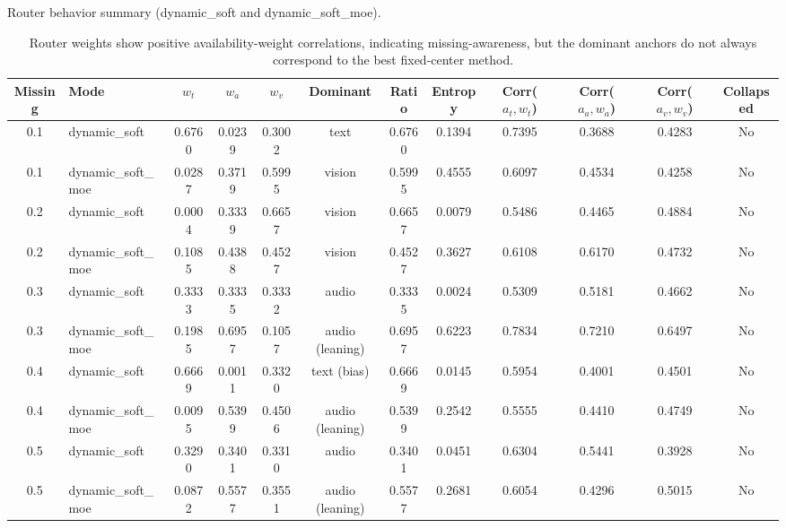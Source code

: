 \begin{table}[t]
\centering
\scriptsize
\caption{Router behavior summary (dynamic\_soft and dynamic\_soft\_moe).}
\label{tab:router_summary}
\begin{tabular}{clcccccccccc}
\toprule
Missing & Mode & $w_t$ & $w_a$ & $w_v$ & Dominant & Ratio & Entropy & Corr($a_t,w_t$) & Corr($a_a,w_a$) & Corr($a_v,w_v$) & Collapsed \\
\midrule
0.1 & dynamic_soft & 0.6760 & 0.0239 & 0.3002 & text & 0.6760 & 0.1394 & 0.7395 & 0.3688 & 0.4283 & No \\
0.1 & dynamic_soft_moe & 0.0287 & 0.3719 & 0.5995 & vision & 0.5995 & 0.4555 & 0.6097 & 0.4534 & 0.4258 & No \\
0.2 & dynamic_soft & 0.0004 & 0.3339 & 0.6657 & vision & 0.6657 & 0.0079 & 0.5486 & 0.4465 & 0.4884 & No \\
0.2 & dynamic_soft_moe & 0.1085 & 0.4388 & 0.4527 & vision & 0.4527 & 0.3627 & 0.6108 & 0.6170 & 0.4732 & No \\
0.3 & dynamic_soft & 0.3333 & 0.3335 & 0.3332 & audio & 0.3335 & 0.0024 & 0.5309 & 0.5181 & 0.4662 & No \\
0.3 & dynamic_soft_moe & 0.1985 & 0.6957 & 0.1057 & audio (leaning) & 0.6957 & 0.6223 & 0.7834 & 0.7210 & 0.6497 & No \\
0.4 & dynamic_soft & 0.6669 & 0.0011 & 0.3320 & text (bias) & 0.6669 & 0.0145 & 0.5954 & 0.4001 & 0.4501 & No \\
0.4 & dynamic_soft_moe & 0.0095 & 0.5399 & 0.4506 & audio (leaning) & 0.5399 & 0.2542 & 0.5555 & 0.4410 & 0.4749 & No \\
0.5 & dynamic_soft & 0.3290 & 0.3401 & 0.3310 & audio & 0.3401 & 0.0451 & 0.6304 & 0.5441 & 0.3928 & No \\
0.5 & dynamic_soft_moe & 0.0872 & 0.5577 & 0.3551 & audio (leaning) & 0.5577 & 0.2681 & 0.6054 & 0.4296 & 0.5015 & No \\
\bottomrule
\end{tabular}
\vspace{0.2em}
\caption*{Router weights show positive availability-weight correlations, indicating missing-awareness, but the dominant anchors do not always correspond to the best fixed-center method.}
\end{table}
